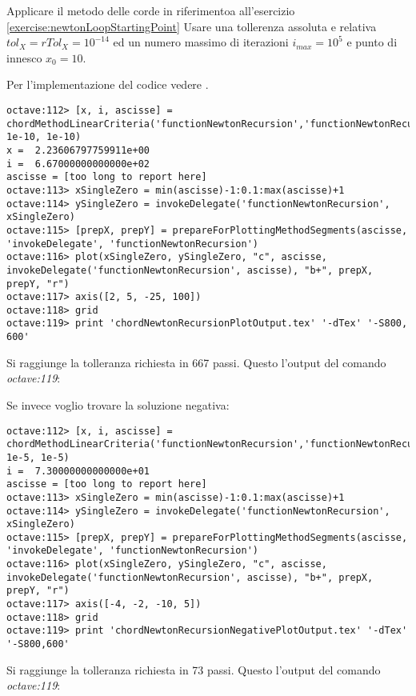 \begin{exercise}
Applicare il metodo delle corde in riferimentoa all'esercizio
\ref{exercise:newtonLoopStartingPoint} 
Usare una tollerenza assoluta e relativa
$tol_{X} = rTol_{X} = 10^{-14}$ ed un numero massimo di iterazioni
$i_{max} = 10^{5}$ e punto di innesco $x_{0} = 10$.
\end{exercise}
Per l'implementazione del codice vedere .
\begin{lstlisting}
octave:112> [x, i, ascisse] = chordMethodLinearCriteria('functionNewtonRecursion','functionNewtonRecursionDerivative',10,1e5, 1e-10, 1e-10)
x =  2.23606797759911e+00
i =  6.67000000000000e+02
ascisse = [too long to report here]
octave:113> xSingleZero = min(ascisse)-1:0.1:max(ascisse)+1
octave:114> ySingleZero = invokeDelegate('functionNewtonRecursion', xSingleZero)
octave:115> [prepX, prepY] = prepareForPlottingMethodSegments(ascisse, 'invokeDelegate', 'functionNewtonRecursion')
octave:116> plot(xSingleZero, ySingleZero, "c", ascisse, invokeDelegate('functionNewtonRecursion', ascisse), "b+", prepX, prepY, "r")
octave:117> axis([2, 5, -25, 100])
octave:118> grid
octave:119> print 'chordNewtonRecursionPlotOutput.tex' '-dTex' '-S800, 600'
\end{lstlisting}
Si raggiunge la tolleranza richiesta in 667 passi. Questo l'output del comando
\emph{octave:119}:
\begin{center}

\end{center}

Se invece voglio trovare la soluzione negativa:
\begin{lstlisting}
octave:112> [x, i, ascisse] = chordMethodLinearCriteria('functionNewtonRecursion','functionNewtonRecursionDerivative',-5,1e5, 1e-5, 1e-5)
i =  7.30000000000000e+01
ascisse = [too long to report here]
octave:113> xSingleZero = min(ascisse)-1:0.1:max(ascisse)+1
octave:114> ySingleZero = invokeDelegate('functionNewtonRecursion', xSingleZero)
octave:115> [prepX, prepY] = prepareForPlottingMethodSegments(ascisse, 'invokeDelegate', 'functionNewtonRecursion')
octave:116> plot(xSingleZero, ySingleZero, "c", ascisse, invokeDelegate('functionNewtonRecursion', ascisse), "b+", prepX, prepY, "r")
octave:117> axis([-4, -2, -10, 5])
octave:118> grid
octave:119> print 'chordNewtonRecursionNegativePlotOutput.tex' '-dTex' '-S800,600'
\end{lstlisting}
Si raggiunge la tolleranza richiesta in 73 passi. Questo l'output del comando
\emph{octave:119}:
\begin{center}

\end{center}
